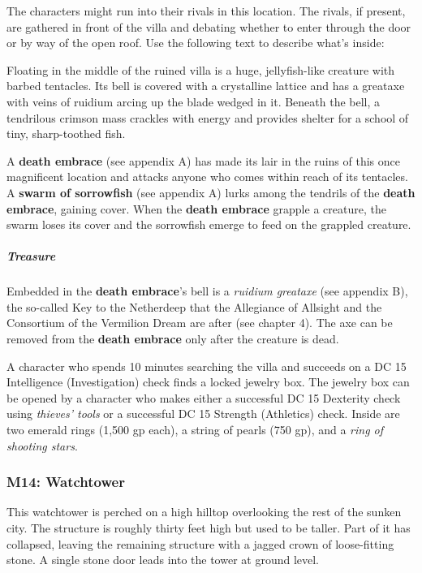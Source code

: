 \documentclass[10pt,a4paper,twoside,fancy,bg=print,twocolumn,openany,nodeprecatedcode]{dndbook}
\begin{document}
The characters might run into their rivals in this location. The rivals, if present, are gathered in front of the villa and debating whether to enter through the door or by way of the open roof. Use the following text to describe what's inside:

\begin{DndReadAloud}{}
Floating in the middle of the ruined villa is a huge, jellyfish-like creature with barbed tentacles. Its bell is covered with a crystalline lattice and has a greataxe with veins of ruidium arcing up the blade wedged in it. Beneath the bell, a tendrilous crimson mass crackles with energy and provides shelter for a school of tiny, sharp-toothed fish.

\end{DndReadAloud}

A \textbf{death embrace} (see appendix A) has made its lair in the ruins of this once magnificent location and attacks anyone who comes within reach of its tentacles. A \textbf{swarm of sorrowfish} (see appendix A) lurks among the tendrils of the \textbf{death embrace}, gaining cover. When the \textbf{death embrace} grapple a creature, the swarm loses its cover and the sorrowfish emerge to feed on the grappled creature.

\subparagraph{Treasure}
Embedded in the \textbf{death embrace}'s bell is a \textit{ruidium greataxe} (see appendix B), the so-called Key to the Netherdeep that the Allegiance of Allsight and the Consortium of the Vermilion Dream are after (see chapter 4). The axe can be removed from the \textbf{death embrace} only after the creature is dead.

A character who spends 10 minutes searching the villa and succeeds on a DC 15 Intelligence (Investigation) check finds a locked jewelry box. The jewelry box can be opened by a character who makes either a successful DC 15 Dexterity check using \textit{thieves' tools} or a successful DC 15 Strength (Athletics) check. Inside are two emerald rings (1,500 gp each), a string of pearls (750 gp), and a \textit{ring of shooting stars}.

\subsubsection{M14: Watchtower}
\begin{DndReadAloud}{}
This watchtower is perched on a high hilltop overlooking the rest of the sunken city. The structure is roughly thirty feet high but used to be taller. Part of it has collapsed, leaving the remaining structure with a jagged crown of loose-fitting stone. A single stone door leads into the tower at ground level.

\end{DndReadAloud}
\end{document}
